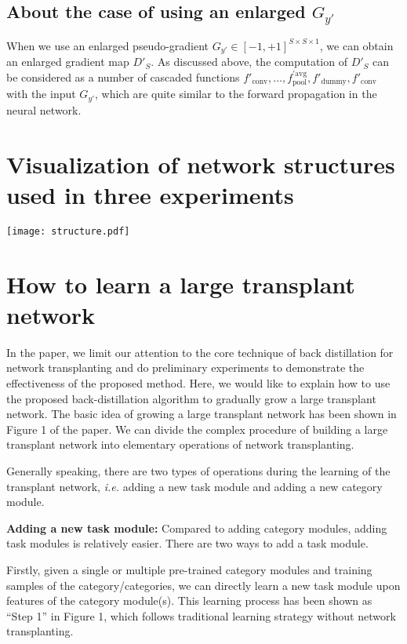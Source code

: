 \documentclass[10pt,twocolumn,letterpaper]{article}
\begin{document}
\subsection*{About the case of using an enlarged $G_{y'}$}

When we use an enlarged pseudo-gradient {\small$G_{y'}\in [-1,+1]^{S\times S\times 1}$}, we can obtain an enlarged gradient map $D'_{S}$. As discussed above, the computation of $D'_{S}$ can be considered as a number of cascaded functions $f'_{\textrm{conv}},\ldots,f_{\textrm{pool}}^{'\textrm{avg}},f'_{\textrm{dummy}},f'_{\textrm{conv}}$ with the input $G_{y'}$, which are quite similar to the forward propagation in the neural network.

\section*{Visualization of network structures used in three experiments}

\vspace{10pt}
\texttt{[image: structure.pdf]}


\newpage
\section*{How to learn a large transplant network}

In the paper, we limit our attention to the core technique of back distillation for network transplanting and do preliminary experiments to demonstrate the effectiveness of the proposed method. Here, we would like to explain how to use the proposed back-distillation algorithm to gradually grow a large transplant network. The basic idea of growing a large transplant network has been shown in Figure 1 of the paper. We can divide the complex procedure of building a large transplant network into elementary operations of network transplanting.

Generally speaking, there are two types of operations during the learning of the transplant network, \emph{i.e.} adding a new task module and adding a new category module.

\textbf{Adding a new task module:} Compared to adding category modules, adding task modules is relatively easier. There are two ways to add a task module.

Firstly, given a single or multiple pre-trained category modules and training samples of the category/categories, we can directly learn a new task module upon features of the category module(s). This learning process has been shown as ``Step 1'' in Figure 1, which follows traditional learning strategy without network transplanting.
\end{document}
